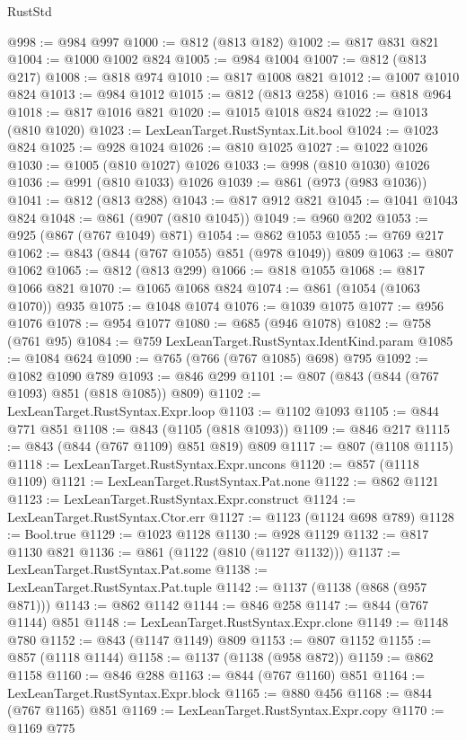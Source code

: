 \begin{lexlean}{RustStd}
\begin{coremodule}
@998 := @984 @997
@1000 := @812 (@813 @182)
@1002 := @817 @831 @821
@1004 := @1000 @1002 @824
@1005 := @984 @1004
@1007 := @812 (@813 @217)
@1008 := @818 @974
@1010 := @817 @1008 @821
@1012 := @1007 @1010 @824
@1013 := @984 @1012
@1015 := @812 (@813 @258)
@1016 := @818 @964
@1018 := @817 @1016 @821
@1020 := @1015 @1018 @824
@1022 := @1013 (@810 @1020)
@1023 := LexLeanTarget.RustSyntax.Lit.bool
@1024 := @1023 @824
@1025 := @928 @1024
@1026 := @810 @1025
@1027 := @1022 @1026
@1030 := @1005 (@810 @1027) @1026
@1033 := @998 (@810 @1030) @1026
@1036 := @991 (@810 @1033) @1026
@1039 := @861 (@973 (@983 @1036))
@1041 := @812 (@813 @288)
@1043 := @817 @912 @821
@1045 := @1041 @1043 @824
@1048 := @861 (@907 (@810 @1045))
@1049 := @960 @202
@1053 := @925 (@867 (@767 @1049) @871)
@1054 := @862 @1053
@1055 := @769 @217
@1062 := @843 (@844 (@767 @1055) @851 (@978 @1049)) @809
@1063 := @807 @1062
@1065 := @812 (@813 @299)
@1066 := @818 @1055
@1068 := @817 @1066 @821
@1070 := @1065 @1068 @824
@1074 := @861 (@1054 (@1063 @1070)) @935
@1075 := @1048 @1074
@1076 := @1039 @1075
@1077 := @956 @1076
@1078 := @954 @1077
@1080 := @685 (@946 @1078)
@1082 := @758 (@761 @95)
@1084 := @759 LexLeanTarget.RustSyntax.IdentKind.param
@1085 := @1084 @624
@1090 := @765 (@766 (@767 @1085) @698) @795
@1092 := @1082 @1090 @789
@1093 := @846 @299
@1101 := @807 (@843 (@844 (@767 @1093) @851 (@818 @1085)) @809)
@1102 := LexLeanTarget.RustSyntax.Expr.loop
@1103 := @1102 @1093
@1105 := @844 @771 @851
@1108 := @843 (@1105 (@818 @1093))
@1109 := @846 @217
@1115 := @843 (@844 (@767 @1109) @851 @819) @809
@1117 := @807 (@1108 @1115)
@1118 := LexLeanTarget.RustSyntax.Expr.uncons
@1120 := @857 (@1118 @1109)
@1121 := LexLeanTarget.RustSyntax.Pat.none
@1122 := @862 @1121
@1123 := LexLeanTarget.RustSyntax.Expr.construct
@1124 := LexLeanTarget.RustSyntax.Ctor.err
@1127 := @1123 (@1124 @698 @789)
@1128 := Bool.true
@1129 := @1023 @1128
@1130 := @928 @1129
@1132 := @817 @1130 @821
@1136 := @861 (@1122 (@810 (@1127 @1132)))
@1137 := LexLeanTarget.RustSyntax.Pat.some
@1138 := LexLeanTarget.RustSyntax.Pat.tuple
@1142 := @1137 (@1138 (@868 (@957 @871)))
@1143 := @862 @1142
@1144 := @846 @258
@1147 := @844 (@767 @1144) @851
@1148 := LexLeanTarget.RustSyntax.Expr.clone
@1149 := @1148 @780
@1152 := @843 (@1147 @1149) @809
@1153 := @807 @1152
@1155 := @857 (@1118 @1144)
@1158 := @1137 (@1138 (@958 @872))
@1159 := @862 @1158
@1160 := @846 @288
@1163 := @844 (@767 @1160) @851
@1164 := LexLeanTarget.RustSyntax.Expr.block
@1165 := @880 @456
@1168 := @844 (@767 @1165) @851
@1169 := LexLeanTarget.RustSyntax.Expr.copy
@1170 := @1169 @775

\end{coremodule}
\end{lexlean}
